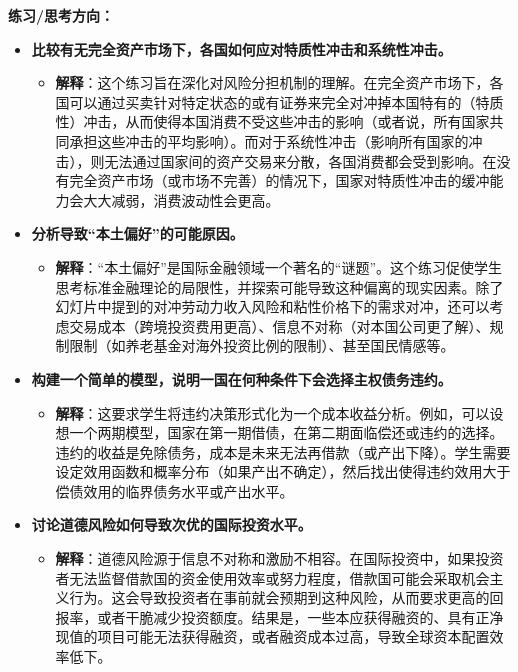 \documentclass[12pt]{article}
\begin{document}
\textbf{练习/思考方向：}
\begin{itemize}
    \item \textbf{比较有无完全资产市场下，各国如何应对特质性冲击和系统性冲击。}
    \begin{itemize}
        \item \textbf{解释}：这个练习旨在深化对风险分担机制的理解。在完全资产市场下，各国可以通过买卖针对特定状态的或有证券来完全对冲掉本国特有的（特质性）冲击，从而使得本国消费不受这些冲击的影响（或者说，所有国家共同承担这些冲击的平均影响）。而对于系统性冲击（影响所有国家的冲击），则无法通过国家间的资产交易来分散，各国消费都会受到影响。在没有完全资产市场（或市场不完善）的情况下，国家对特质性冲击的缓冲能力会大大减弱，消费波动性会更高。
    \end{itemize}
    \item \textbf{分析导致“本土偏好”的可能原因。}
    \begin{itemize}
        \item \textbf{解释}：“本土偏好”是国际金融领域一个著名的“谜题”。这个练习促使学生思考标准金融理论的局限性，并探索可能导致这种偏离的现实因素。除了幻灯片中提到的对冲劳动力收入风险和粘性价格下的需求对冲，还可以考虑交易成本（跨境投资费用更高）、信息不对称（对本国公司更了解）、规制限制（如养老基金对海外投资比例的限制）、甚至国民情感等。
    \end{itemize}
    \item \textbf{构建一个简单的模型，说明一国在何种条件下会选择主权债务违约。}
    \begin{itemize}
        \item \textbf{解释}：这要求学生将违约决策形式化为一个成本收益分析。例如，可以设想一个两期模型，国家在第一期借债，在第二期面临偿还或违约的选择。违约的收益是免除债务，成本是未来无法再借款（或产出下降）。学生需要设定效用函数和概率分布（如果产出不确定），然后找出使得违约效用大于偿债效用的临界债务水平或产出水平。
    \end{itemize}
    \item \textbf{讨论道德风险如何导致次优的国际投资水平。}
    \begin{itemize}
        \item \textbf{解释}：道德风险源于信息不对称和激励不相容。在国际投资中，如果投资者无法监督借款国的资金使用效率或努力程度，借款国可能会采取机会主义行为。这会导致投资者在事前就会预期到这种风险，从而要求更高的回报率，或者干脆减少投资额度。结果是，一些本应获得融资的、具有正净现值的项目可能无法获得融资，或者融资成本过高，导致全球资本配置效率低下。
    \end{itemize}
\end{itemize}
\end{document}

